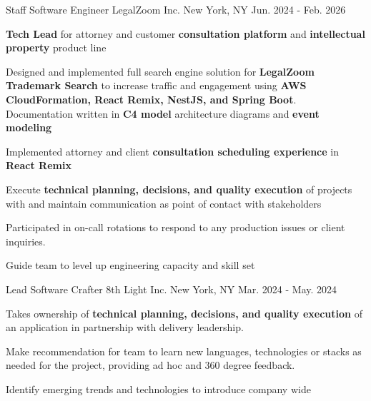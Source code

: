 

\begin{cventries}

  \cventry
    {Staff Software Engineer} %
    {LegalZoom Inc.}
    {New York, NY} %
    {Jun. 2024 - Feb. 2026} %
    {
      \begin{cvitems} %
        \item \textbf{Tech Lead} for attorney and customer \textbf{consultation platform} and \textbf{intellectual property} product line
        \item Designed and implemented full search engine solution for \textbf{LegalZoom Trademark Search} to increase traffic and engagement using \textbf{AWS CloudFormation, React Remix, NestJS, and Spring Boot}. Documentation written in \textbf{C4 model} architecture diagrams and \textbf{event modeling}
        \item Implemented attorney and client \textbf{consultation scheduling experience} in \textbf{React Remix}
        \item Execute \textbf{technical planning, decisions, and quality execution} of projects with and maintain communication as point of contact with stakeholders
        \item Participated in on-call rotations to respond to any production issues or client inquiries. 
        \item Guide team to level up engineering capacity and skill set 
      \end{cvitems}
    }
    
  \cventry
    {Lead Software Crafter} %
    {8th Light Inc.}
    {New York, NY} %
    {Mar. 2024 - May. 2024} %
    {
      \begin{cvitems} %
        \item Takes ownership of \textbf{technical planning, decisions, and quality execution} of an application in partnership with delivery leadership.
        \item Make recommendation for team to learn new languages, technologies or stacks as needed for the project, providing ad hoc and 360 degree feedback.
        \item Identify emerging trends and technologies to introduce company wide
      \end{cvitems}
    }


\end{cventries}
